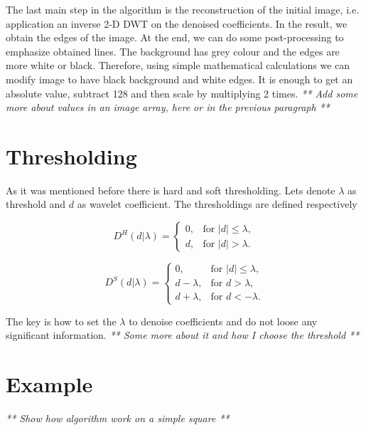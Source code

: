 The last main step in the algorithm is the reconstruction of the initial image, i.e. application an inverse 2-D DWT on the denoised coefficients. In the result, we obtain the edges of the image. At the end, we can do some post-processing to emphasize obtained lines. The background has grey colour and the edges are more white or black. Therefore, using simple mathematical calculations we can modify image to have black background and white edges. It is enough to get an absolute value, subtract 128 and then scale by multiplying 2 times.
\textit{** Add some more about values in an image array, here or in the previous paragraph **}

\section{Thresholding}
\label{sec:threshold}
 As it was mentioned before there is hard and soft thresholding. Lets denote $\lambda$ as threshold and $d$ as wavelet coefficient. The thresholdings are defined respectively
 
\begin{equation}
D^H(d|\lambda)=
\begin{cases}
	0,& \text{for } |d| \leq \lambda,\\
	d,& \text{for } |d| > \lambda.
\end{cases}
\end{equation}

\begin{equation}
D^S(d|\lambda)=
\begin{cases}
	0,& \text{for } |d| \leq \lambda,\\
	d-\lambda,& \text{for } d > \lambda, \\
	d+\lambda,& \text{for } d < -\lambda.
\end{cases}
\end{equation}

The key is how to set the $\lambda$ to denoise coefficients and do not loose any significant information.
\textit{** Some more about it and how I choose the threshold **}

\section{Example}

\textit{** Show how algorithm work on a simple square **}